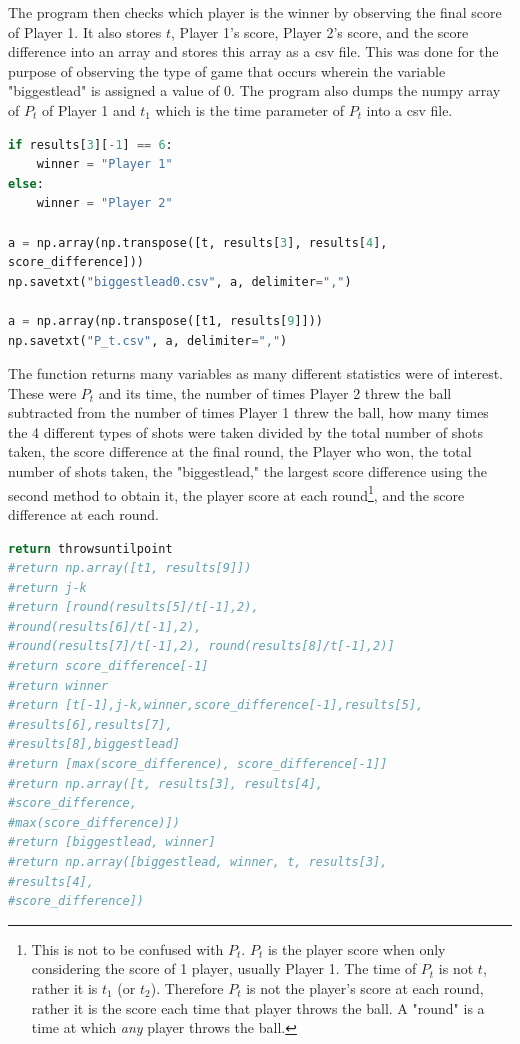 \documentclass{article}
\begin{document}
The program then checks which player is the winner by observing the final score of Player 1. It also stores $t$, Player 1's score, Player 2's score, and the score difference into an array and stores this array as a csv file. This was done for the purpose of observing the type of game that occurs wherein the variable "biggestlead" is assigned a value of 0. The program also dumps the numpy array of $P_t$ of Player 1 and $t_1$ which is the time parameter of $P_t$ into a csv file.

\begin{lstlisting}[language=Python]
if results[3][-1] == 6:
    winner = "Player 1"
else:
    winner = "Player 2"

a = np.array(np.transpose([t, results[3], results[4],
score_difference]))
np.savetxt("biggestlead0.csv", a, delimiter=",")

a = np.array(np.transpose([t1, results[9]]))
np.savetxt("P_t.csv", a, delimiter=",")
\end{lstlisting}

The function returns many variables as many different statistics were of interest. These were $P_t$ and its time, the number of times Player 2 threw the ball subtracted from the number of times Player 1 threw the ball, how many times the 4 different types of shots were taken divided by the total number of shots taken, the score difference at the final round, the Player who won, the total number of shots taken, the "biggestlead," the largest score difference using the second method to obtain it, the player score at each round\footnote{This is not to be confused with $P_t$. $P_t$ is the player score when only considering the score of 1 player, usually Player 1. The time of $P_t$ is not $t$, rather it is $t_1$ (or $t_2$). Therefore $P_t$ is not the player's score at each round, rather it is the score each time that player throws the ball. A "round" is a time at which \textit{any} player throws the ball.}, and the score difference at each round.

\begin{lstlisting}[language=Python]
return throwsuntilpoint
#return np.array([t1, results[9]])
#return j-k
#return [round(results[5]/t[-1],2),
#round(results[6]/t[-1],2), 
#round(results[7]/t[-1],2), round(results[8]/t[-1],2)]
#return score_difference[-1]    
#return winner
#return [t[-1],j-k,winner,score_difference[-1],results[5],
#results[6],results[7],
#results[8],biggestlead]
#return [max(score_difference), score_difference[-1]]
#return np.array([t, results[3], results[4], 
#score_difference, 
#max(score_difference)])
#return [biggestlead, winner]
#return np.array([biggestlead, winner, t, results[3], 
#results[4], 
#score_difference])
\end{lstlisting}
\end{document}
